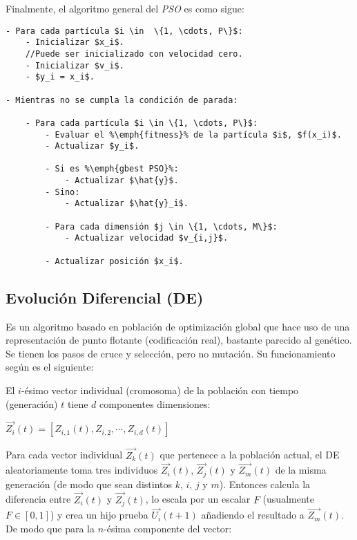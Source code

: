     Finalmente, el algoritmo general del \emph{PSO} es como sigue\cite{PSO_0}:
\begin{lstlisting}[float=h, caption=Algoritmo General PSO]
- Para cada partícula $i \in  \{1, \cdots, P\}$:
    - Inicializar $x_i$.
    //Puede ser inicializado con velocidad cero.
    - Inicializar $v_i$.
    - $y_i = x_i$.

- Mientras no se cumpla la condición de parada:

    - Para cada partícula $i \in \{1, \cdots, P\}$:
        - Evaluar el %\emph{fitness}% de la partícula $i$, $f(x_i)$.
        - Actualizar $y_i$.

        - Si es %\emph{gbest PSO}%:
            - Actualizar $\hat{y}$.
        - Sino:
            - Actualizar $\hat{y}_i$.

        - Para cada dimensión $j \in \{1, \cdots, M\}$:
            - Actualizar velocidad $v_{i,j}$.

        - Actualizar posición $x_i$.
\end{lstlisting}

\subsection{Evolución Diferencial (DE)}

Es un algoritmo basado en poblaci\'on de
optimizaci\'on global que hace uso de una representaci\'on de punto flotante
(codificaci\'on real), bastante parecido al gen\'etico. Se tienen los pasos de cruce 
y selecci\'on, pero no mutaci\'on. Su funcionamiento seg\'un \cite{SwAjAm2008}
es el siguiente:

El $i$-\'esimo vector individual (cromosoma)
de la poblaci\'on con tiempo (generaci\'on) $t$ tiene $d$ componentes
dimensiones:

\begin{center}
$ \overrightarrow{Z_i}(t) = [ Z_{i,1}(t), Z_{i,2}, \cdots, Z_{i,d}(t) ] $
\end{center}

Para cada vector individual $\overrightarrow{Z_k}(t)$ que pertenece
a la poblaci\'on actual, el DE aleatoriamente toma tres individuos
$\overrightarrow{Z_i}(t)$, $\overrightarrow{Z_j}(t)$ y $\overrightarrow{Z_m}(t)$ de la misma generaci\'on (de modo que sean distintos $k$, 
$i$, $j$ y $m$). Entonces calcula la diferencia entre $\overrightarrow{Z_i}(t)$ y $\overrightarrow{Z_j}(t)$, lo escala por un escalar $F$
(usualmente $F \in [0, 1]$) y crea un hijo prueba $\overrightarrow{U_i}(t + 1)$ a\~nadiendo el resultado a $\overrightarrow{Z_m}(t)$. De modo
que para la $n$-\'esima componente del vector:

